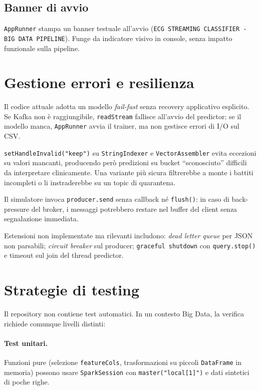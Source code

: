 \subsection{Banner di avvio}

\texttt{AppRunner} stampa un banner testuale all'avvio (\texttt{ECG STREAMING CLASSIFIER - BIG DATA PIPELINE}).
Funge da indicatore visivo in console, senza impatto funzionale sulla pipeline.

\section{Gestione errori e resilienza}\label{sec:error-handling}

Il codice attuale adotta un modello \emph{fail-fast} senza recovery applicativo esplicito.
Se Kafka non è raggiungibile, \texttt{readStream} fallisce all'avvio del predictor; se il modello manca, \texttt{AppRunner} avvia il trainer, ma non gestisce errori di I/O sul CSV.

\texttt{setHandleInvalid("keep")} su \texttt{StringIndexer} e \texttt{VectorAssembler} evita eccezioni su valori mancanti, producendo però predizioni su bucket ``sconosciuto'' difficili da interpretare clinicamente.
Una variante più sicura filtrerebbe a monte i battiti incompleti o li instraderebbe su un topic di quarantena.

Il simulatore invoca \texttt{producer.send} senza callback né \texttt{flush()}: in caso di back-pressure del broker, i messaggi potrebbero restare nel buffer del client senza segnalazione immediata.

Estensioni non implementate ma rilevanti includono: \emph{dead letter queue} per JSON non parsabili; \emph{circuit breaker} sul producer; \texttt{graceful shutdown} con \texttt{query.stop()} e timeout sul join del thread predictor.

\section{Strategie di testing}\label{sec:testing}

Il repository non contiene test automatici.
In un contesto Big Data, la verifica richiede comunque livelli distinti:

\paragraph{Test unitari.}
Funzioni pure (selezione \texttt{featureCols}, trasformazioni su piccoli \texttt{DataFrame} in memoria) possono usare \texttt{SparkSession} con \texttt{master("local[1]")} e dati sintetici di poche righe.

